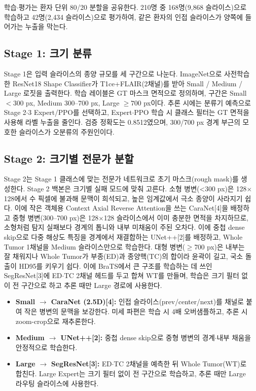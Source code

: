 \documentclass[11pt,a4paper]{article}
\begin{document}
학습$\cdot$평가는 환자 단위 80/20 분할을 공유한다. 210명 중 168명(9,868 슬라이스)으로 학습하고 42명(2,434 슬라이스)으로 평가하여, 같은 환자의 인접 슬라이스가 양쪽에 들어가는 누출을 막는다.

\subsection{Stage 1: 크기 분류}
Stage 1은 입력 슬라이스의 종양 규모를 세 구간으로 나눈다. ImageNet으로 사전학습한 ResNet18 Shape Classifier가 T1ce+FLAIR(2채널)를 받아 Small / Medium / Large 로짓을 출력한다. 학습 레이블은 GT 마스크 면적으로 정의하며, 구간은 Small $<300$ px, Medium 300--700 px, Large $\ge 700$ px이다. 추론 시에는 분류기 예측으로 Stage 2$\cdot$3 Expert/PPO를 선택하고, Expert$\cdot$PPO 학습 시 클래스 필터는 GT 면적을 사용해 라벨 누출을 줄인다. 검증 정확도는 0.8512였으며, 300/700 px 경계 부근의 모호한 슬라이스가 오분류의 주원인이다.

\subsection{Stage 2: 크기별 전문가 분할}
Stage 2는 Stage 1 클래스에 맞는 전문가 네트워크로 초기 마스크(rough mask)를 생성한다.
Stage 2 백본은 크기별 실패 모드에 맞춰 고른다. 소형 병변(<300 px)은 128$\times$128에서 수 픽셀에 불과해 문맥이 희석되고, 높은 임계값에서 극소 종양이 사라지기 쉽다. 이에 작은 객체용 Context Axial Reverse Attention을 쓰는 CaraNet[4]을 배정하고 중형 병변(300--700 px)은 128$\times$128 슬라이스에서 이미 충분한 면적을 차지하므로, 소형처럼 탐지 실패보다 경계의 톱니와 내부 미채움이 주된 오차다. 이에 중첩 dense skip으로 다중 해상도 특징을 경계에서 재결합하는 UNet++[2]를 배정하고, Whole Tumor 1채널을 Medium 슬라이스만으로 학습한다. 대형 병변($\ge$700 px)은 내부는 잘 채워지나 Whole Tumor가 부종(ED)과 종양핵(TC)의 합이라 윤곽이 길고, 국소 돌출이 HD95를 키우기 쉽다. 이에 BraTS에서 큰 구조를 학습하는 데 쓰인 SegResNet[3]에 ED$\cdot$TC 2채널 헤드를 두고 합쳐 WT를 만들며, 학습은 크기 필터 없이 전 구간으로 하고 추론 때만 Large 경로에 사용한다.

\begin{itemize}
    \item \textbf{Small $\rightarrow$ CaraNet (2.5D)[4]:} 인접 슬라이스(prev/center/next)를 채널로 붙여 작은 병변의 문맥을 보강한다. 미세 파편은 학습 시 4배 오버샘플하고, 추론 시 zoom-crop으로 재추론한다.
    \item \textbf{Medium $\rightarrow$ UNet++[2]:} 중첩 dense skip으로 중형 병변의 경계$\cdot$내부 채움을 안정적으로 학습한다.
    \item \textbf{Large $\rightarrow$ SegResNet[3]:} ED$\cdot$TC 2채널을 예측한 뒤 Whole Tumor(WT)로 합친다. Large Expert는 크기 필터 없이 전 구간으로 학습하고, 추론 때만 Large 라우팅 슬라이스에 사용한다.
\end{itemize}
\end{document}
